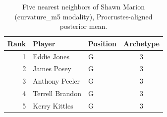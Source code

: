 \begin{table}[htbp]
  \centering\small
  \begin{tabular}{rllc}
    \toprule
    Rank & Player & Position & Archetype \\
    \midrule
    1 & Eddie Jones & G & 3 \\
    2 & James Posey & G & 3 \\
    3 & Anthony Peeler & G & 3 \\
    4 & Terrell Brandon & G & 3 \\
    5 & Kerry Kittles & G & 3 \\
    \bottomrule
  \end{tabular}
  \caption{Five nearest neighbors of Shawn Marion (curvature_m5 modality), Procrustes-aligned posterior mean.}
  \label{tab:Shawn_Marion_neighbors_curvature_m5}
\end{table}

